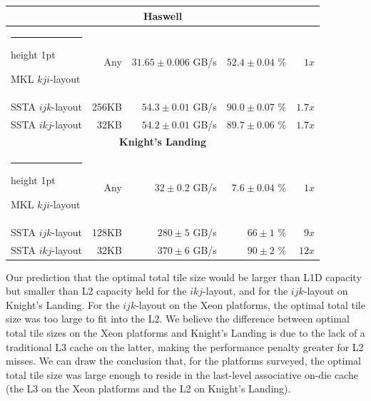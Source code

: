 \documentclass[10pt, conference, compsocconf]{IEEEtran}
\makeatletter
\newcommand{\textapprox}{\texttildelow}
\newcommand{\thickhline}{%
    \noalign {\ifnum 0=`}\fi \hrule height 1pt
    \futurelet \reserved@a \@xhline
}
\makeatother
\begin{document}
\begin{table}[t]
\begin{tabular}{|l|r|r|r|r|}
    \multicolumn{5}{c}{\rule{0pt}{2.25ex} \textbf{Haswell}}           \\ \hline \thickhline
    MKL \(kji\)-layout  &   Any & \(31.65 \pm 0.006\) GB/s & \(52.4 \pm 0.04\) \% & \(1x\)        \\ \hline
    SSTA \(ijk\)-layout & 256KB &   \(54.3 \pm 0.01\) GB/s & \(90.0 \pm 0.07\) \% & \textapprox \(1.7x\) \\ \hline
    SSTA \(ikj\)-layout &  32KB &   \(54.2 \pm 0.01\) GB/s & \(89.7 \pm 0.06\) \% & \textapprox \(1.7x\) \\ \hline

    \multicolumn{5}{c}{\rule{0pt}{2.25ex} \textbf{Knight's Landing}}  \\ \hline \thickhline
    MKL \(kji\)-layout  &   Any & \(32 \pm 0.2\) GB/s &\(7.6 \pm 0.04\) \% & \(1x\)               \\ \hline
    SSTA \(ijk\)-layout & 128KB &  \(280 \pm 5\) GB/s &\(66 \pm 1\) \%     & \textapprox \(9x\)          \\ \hline
    SSTA \(ikj\)-layout &  32KB &  \(370 \pm 6\) GB/s &\(90 \pm 2\) \%     & \textapprox \(12x\)         \\ \hline
  \end{tabular}
\end{table}

Our prediction that the optimal total tile size would be larger than L1D
  capacity but smaller than L2 capacity held for the \(ikj\)-layout, and for 
  the \(ijk\)-layout on Knight's Landing.
For the \(ijk\)-layout on the Xeon platforms, the optimal total tile size was
  too large to fit into the L2.
We believe the difference between optimal total tile sizes on the Xeon
  platforms and Knight's Landing is due to the lack of a traditional L3 cache on
  the latter, making the performance penalty greater for L2 misses.
We can draw the conclusion that, for the platforms surveyed, the optimal total
  tile size was large enough to reside in the last-level associative on-die
  cache (the L3 on the Xeon platforms and the L2 on Knight's Landing).
\end{document}
